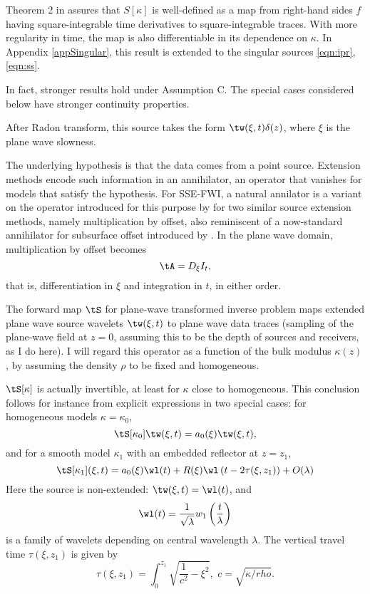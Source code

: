 Theorem 2 in \cite[]{BlazekStolkSymes:13} assures that $S[\kappa]$ is
well-defined as a map from right-hand sides $f$ having
square-integrable time derivatives to square-integrable traces. With
more regularity in time, the map is also differentiable in its
dependence on $\kappa$. In Appendix \ref{appSingular}, this result is
extended to the singular sources \ref{eqn:ipr}, \ref{eqn:ss}.

In fact, stronger results hold under Assumption C. The special cases
considered below have stronger continuity properties.



After Radon transform, this source takes the form
$\tw(\xi,t)\delta(z)$, where $\xi$ is the plane wave slowness. 

The underlying hypothesis is that the data comes from a point
source. Extension methods encode such information in an annihilator,
an operator that vanishes for models that satisfy the hypothesis. For
SSE-FWI, a natural annilator is a variant on the operator introduced
for this purpose by \cite{HuangSymes:Geo18a,HuangSymes:Geo18b} for two
similar source extension methods, namely multiplication by offset,
also reminiscent of a now-standard annihilator for subsurface offset
introduced by \cite{stolk2001c}. In the plane wave domain,
multiplication by offset becomes 
\[
\tA = D_{\xi}I_t,
\]
that is, differentiation in $\xi$ and integration in $t$, in either
order.

The forward map $\tS$ for plane-wave transformed inverse problem maps
extended plane wave source wavelets $\tw(\xi,t)$ to plane wave data
traces (sampling of the plane-wave field at $z=0$, assuming this to be the
depth of sources and receivers, as I do here). I will regard this operator as a
function of the bulk modulus $\kappa(z)$, by assuming the density
$\rho$ to be fixed and homogeneous. 

$\tS[\kappa]$ is 
actually invertible, at least for $\kappa$ close to homogeneous. This conclusion follows for instance
from explicit expressions in two special cases: for homogeneous models
$\kappa=\kappa_0$, 
\[
\tS[\kappa_0]\tw(\xi,t) = a_0(\xi)\tw(\xi,t),
\]
and for a smooth model $\kappa_1$ with an embedded reflector at $z=z_1$,
\[
\tS[\kappa_1](\xi,t) = a_0(\xi)\wl(t) +
R(\xi)\wl\left(t-2\tau(\xi,z_1)\right) + O(\lambda)
\]
Here the source is non-extended: $\tw(\xi,t)=\wl(t)$, and 
\[
\wl(t)=\frac{1}{\sqrt{\lambda}}w_1\left(\frac{t}{\lambda}\right)
\]
is a family of wavelets depending on central wavelength $\lambda$. The
vertical travel time $\tau(\xi,z_1)$ is given by
\[
\tau(\xi,z_1) = \int_0^{z_1}\sqrt{\frac{1}{c^2}-\xi^2},\,\,c=\sqrt{\kappa/rho}.
\]

